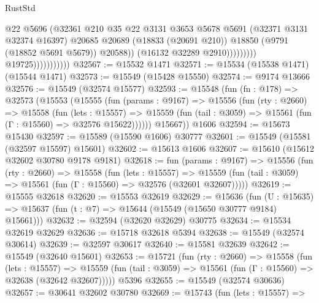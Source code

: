 \begin{lexlean}{RustStd}
\begin{coremodule}
                                            @22
                                            @5696
                                            (@32361
                                              @210
                                              @35
                                              @22
                                              @3131
                                              @3653
                                              @5678
                                              @5691
                                              (@32371 @3131 @32374 @16397)
                                              @20685
                                              @20689
                                              (@18833 (@20691 @210))
                                              @18850
                                              (@9791 (@18852 @5691 @5679))
                                              @20588))
                                          (@16132 @32289 @2910)))))))))
                          @19725)))))))))))
@32567 := @15532 @1471
@32571 := @15534 (@15538 @1471) (@15544 @1471)
@32573 := @15549 (@15428 @15550)
@32574 := @9174 @13666
@32576 := @15549 (@32574 @15577)
@32593 := @15548
    (fun (fn : @178) =>
    @32573
      (@15553
        (@15555
          (fun (params : @9167) =>
          @15556
            (fun (rty : @2660) =>
            @15558
              (fun (lets : @15557) =>
              @15559 (fun (tail : @3059) => @15561 (fun (Γ : @15560) => @32576 @15622))))))
        @15667))
    @1606
@32594 := @15673 @15430
@32597 := @15589 (@15590 @1606) @30777
@32601 := @15549 (@15581 (@32597 @15597) @15601)
@32602 := @15613 @1606
@32607 := @15610 (@15612 @32602 @30780 @9178 @9181)
@32618 := fun (params : @9167) =>
  @15556
    (fun (rty : @2660) =>
    @15558
      (fun (lets : @15557) =>
      @15559 (fun (tail : @3059) => @15561 (fun (Γ : @15560) => @32576 (@32601 @32607)))))
@32619 := @15555 @32618
@32620 := @15553 @32619
@32629 := @15636
    (fun (U : @15635) => @15637 (fun (t : @7) => @15644 (@15549 (@15650 @30777 @9184) @15661)))
@32632 := @32594 (@32620 @32629) @30775
@32634 := @15534 @32619 @32629
@32636 := @15718 @32618 @5394
@32638 := @15549 (@32574 @30614)
@32639 := @32597 @30617
@32640 := @15581 @32639
@32642 := @15549 (@32640 @15601)
@32653 := @15721
    (fun (rty : @2660) =>
    @15558
      (fun (lets : @15557) =>
      @15559 (fun (tail : @3059) => @15561 (fun (Γ : @15560) => @32638 (@32642 @32607)))))
    @5396
@32655 := @15549 (@32574 @30636)
@32657 := @30641 @32602 @30780
@32669 := @15743
    (fun (lets : @15557) =>

\end{coremodule}
\end{lexlean}
